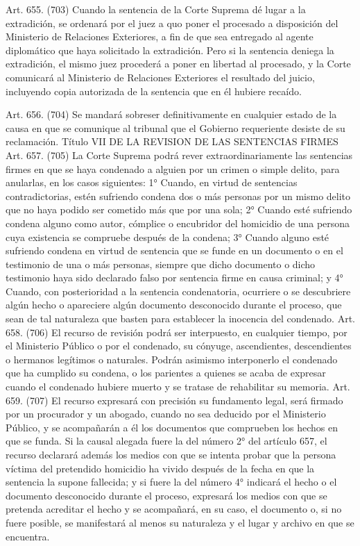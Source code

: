     Art. 655. (703) Cuando la sentencia de la Corte Suprema dé lugar a la extradición, se ordenará por el juez a quo poner el procesado a disposición del Ministerio de Relaciones Exteriores, a fin de que sea entregado al agente diplomático que haya solicitado la extradición.
    Pero si la sentencia deniega la extradición, el mismo juez procederá a poner en libertad al procesado, y la Corte comunicará al Ministerio de Relaciones Exteriores el resultado del juicio, incluyendo copia autorizada de la sentencia que en él hubiere recaído.


    Art. 656. (704) Se mandará sobreser definitivamente en cualquier estado de la causa en que se comunique al tribunal que el Gobierno requeriente desiste de su reclamación.
    Título VII
    DE LA REVISION DE LAS SENTENCIAS FIRMES
    Art. 657. (705) La Corte Suprema podrá rever extraordinariamente las sentencias firmes en que se haya condenado a alguien por un crimen o simple delito, para anularlas, en los casos siguientes:
    1° Cuando, en virtud de sentencias contradictorias, estén sufriendo condena dos o más personas por un mismo delito que no haya podido ser cometido más que por una sola;
    2° Cuando esté sufriendo condena alguno como autor, cómplice o encubridor del homicidio de una persona cuya existencia se compruebe después de la condena;
    3° Cuando alguno esté sufriendo condena en virtud de sentencia que se funde en un documento o en el testimonio de una o más personas, siempre que dicho documento o dicho testimonio haya sido declarado falso por sentencia firme en causa criminal; y
    4° Cuando, con posterioridad a la sentencia condenatoria, ocurriere o se descubriere algún hecho o apareciere algún documento desconocido durante el proceso, que sean de tal naturaleza que basten para establecer la inocencia del condenado.
    Art. 658. (706) El recurso de revisión podrá ser interpuesto, en cualquier tiempo, por el Ministerio Público o por el condenado, su cónyuge, ascendientes, descendientes o hermanos legítimos o naturales. Podrán asimismo interponerlo el condenado que ha cumplido su condena, o los parientes a quienes se acaba de expresar cuando el condenado hubiere muerto y se tratase de rehabilitar su memoria.
    Art. 659. (707) El recurso expresará con precisión su fundamento legal, será firmado por un procurador y un abogado, cuando no sea deducido por el Ministerio Público, y se acompañarán a él los documentos que comprueben los hechos en que se funda.
    Si la causal alegada fuere la del número 2° del artículo 657, el recurso declarará además los medios con que se intenta probar que la persona víctima del pretendido homicidio ha vivido después de la fecha en  que la sentencia la supone fallecida; y si fuere la del número 4° indicará el hecho o el documento desconocido durante el proceso, expresará los medios con que se pretenda acreditar el hecho y se acompañará, en su caso, el documento o, si no fuere posible, se manifestará al menos su naturaleza y el lugar y archivo en que se encuentra.
